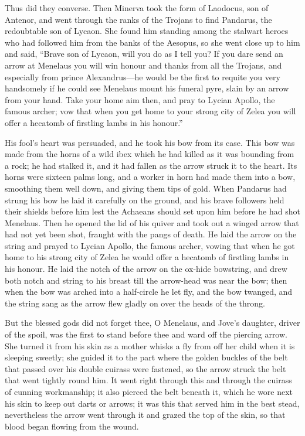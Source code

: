 Thus did they converse. Then Minerva took the form of Laodocus, son of
Antenor, and went through the ranks of the Trojans to find Pandarus, the
redoubtable son of Lycaon. She found him standing among the stalwart
heroes who had followed him from the banks of the Aesopus, so she went
close up to him and said, “Brave son of Lycaon, will you do as I tell you?
If you dare send an arrow at Menelaus you will win honour and thanks from
all the Trojans, and especially from prince Alexandrus—he would be
the first to requite you very handsomely if he could see Menelaus mount
his funeral pyre, slain by an arrow from your hand. Take your home aim
then, and pray to Lycian Apollo, the famous archer; vow that when you get
home to your strong city of Zelea you will offer a hecatomb of firstling
lambs in his honour.”

His fool’s heart was persuaded, and he took his bow from its case. This
bow was made from the horns of a wild ibex which he had killed as it was
bounding from a rock; he had stalked it, and it had fallen as the arrow
struck it to the heart. Its horns were sixteen palms long, and a worker in
horn had made them into a bow, smoothing them well down, and giving them
tips of gold. When Pandarus had strung his bow he laid it carefully on the
ground, and his brave followers held their shields before him lest the
Achaeans should set upon him before he had shot Menelaus. Then he opened
the lid of his quiver and took out a winged arrow that had not yet been
shot, fraught with the pangs of death. He laid the arrow on the string and
prayed to Lycian Apollo, the famous archer, vowing that when he got home
to his strong city of Zelea he would offer a hecatomb of firstling lambs
in his honour. He laid the notch of the arrow on the ox-hide bowstring, and
drew both notch and string to his breast till the arrow-head was near the
bow; then when the bow was arched into a half-circle he let fly, and the
bow twanged, and the string sang as the arrow flew gladly on over the
heads of the throng.

But the blessed gods did not forget thee, O Menelaus, and Jove’s daughter,
driver of the spoil, was the first to stand before thee and ward off the
piercing arrow. She turned it from his skin as a mother whisks a fly from
off her child when it is sleeping sweetly; she guided it to the part where
the golden buckles of the belt that passed over his double cuirass were
fastened, so the arrow struck the belt that went tightly round him. It
went right through this and through the cuirass of cunning workmanship; it
also pierced the belt beneath it, which he wore next his skin to keep out
darts or arrows; it was this that served him in the best stead,
nevertheless the arrow went through it and grazed the top of the skin, so
that blood began flowing from the wound.

